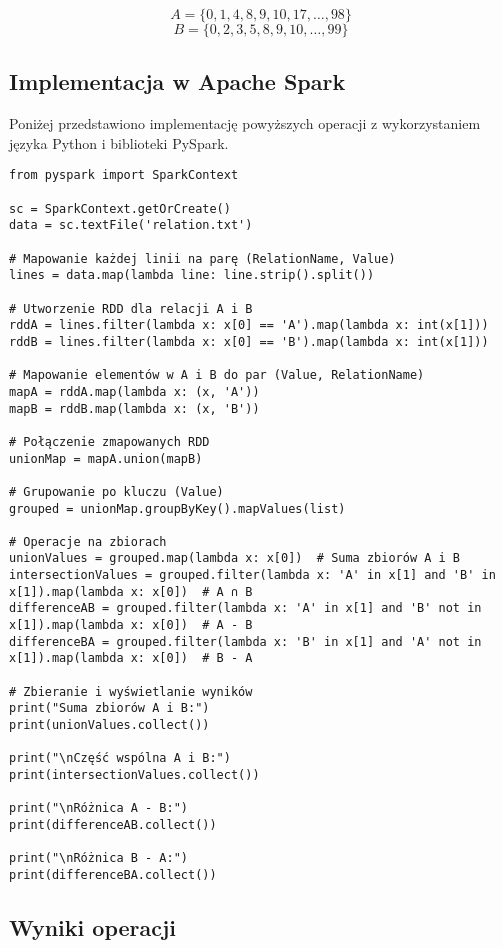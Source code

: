 \documentclass{article}
\begin{document}
\[
A = \{0, 1, 4, 8, 9, 10, 17, \dots, 98\}
\]
\[
B = \{0, 2, 3, 5, 8, 9, 10, \dots, 99\}
\]

\subsection{Implementacja w Apache Spark}

Poniżej przedstawiono implementację powyższych operacji z wykorzystaniem języka Python i biblioteki PySpark.

\begin{lstlisting}[style=pystyle, caption=Przetwarzanie pliku \texttt{relation.txt}]
from pyspark import SparkContext

sc = SparkContext.getOrCreate()
data = sc.textFile('relation.txt')

# Mapowanie każdej linii na parę (RelationName, Value)
lines = data.map(lambda line: line.strip().split())

# Utworzenie RDD dla relacji A i B
rddA = lines.filter(lambda x: x[0] == 'A').map(lambda x: int(x[1]))
rddB = lines.filter(lambda x: x[0] == 'B').map(lambda x: int(x[1]))

# Mapowanie elementów w A i B do par (Value, RelationName)
mapA = rddA.map(lambda x: (x, 'A'))
mapB = rddB.map(lambda x: (x, 'B'))

# Połączenie zmapowanych RDD
unionMap = mapA.union(mapB)

# Grupowanie po kluczu (Value)
grouped = unionMap.groupByKey().mapValues(list)

# Operacje na zbiorach
unionValues = grouped.map(lambda x: x[0])  # Suma zbiorów A i B
intersectionValues = grouped.filter(lambda x: 'A' in x[1] and 'B' in x[1]).map(lambda x: x[0])  # A ∩ B
differenceAB = grouped.filter(lambda x: 'A' in x[1] and 'B' not in x[1]).map(lambda x: x[0])  # A - B
differenceBA = grouped.filter(lambda x: 'B' in x[1] and 'A' not in x[1]).map(lambda x: x[0])  # B - A

# Zbieranie i wyświetlanie wyników
print("Suma zbiorów A i B:")
print(unionValues.collect())

print("\nCzęść wspólna A i B:")
print(intersectionValues.collect())

print("\nRóżnica A - B:")
print(differenceAB.collect())

print("\nRóżnica B - A:")
print(differenceBA.collect())
\end{lstlisting}

\subsection{Wyniki operacji}
\end{document}
